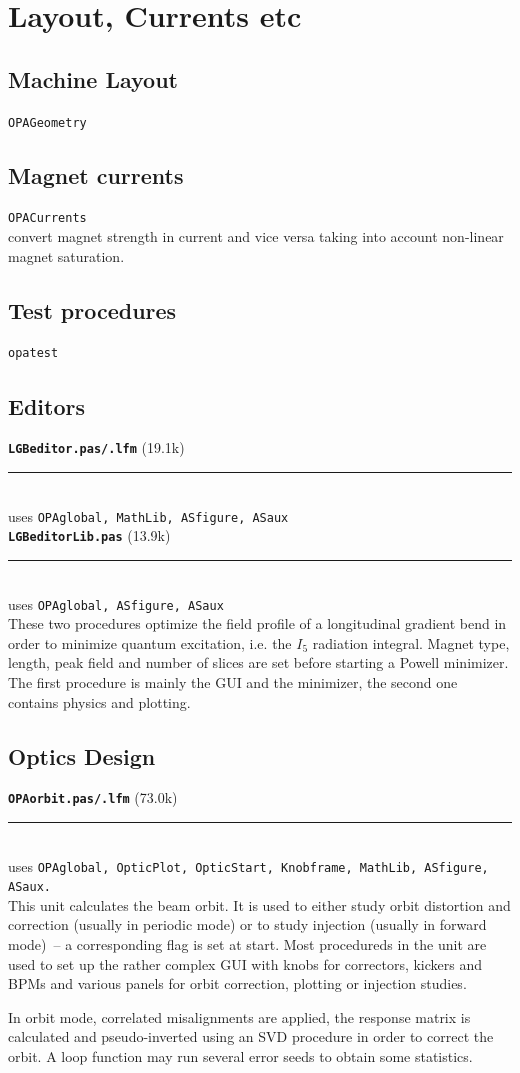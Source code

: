 \documentclass[12pt]{article}
\newcommand\code[1]{{\tt #1}}
\newcommand{\unico}[1]{{\color{burntorange}\code{#1}}}
\newcommand{\opagui}[1]{\colorbox{blue!20}{\code{#1}}}
\newcommand{\oguih}[2]{\subsection{\label{#2}#1}{\Huge\opagui{#2}}\\}
\newcommand{\opauni}[1]{\colorbox{orange!30}{\code{#1}}}
\newcommand{\ounih}[2]{\subsection{\label{#2}#1}{\Huge\opauni{#2}}\\}
\newcommand\opamodule[3]{{\bf \tt #1} #2\\  \rule[3pt]{\textwidth}{0.2pt} \\ {\scriptsize uses \tt  #3}\\[1ex]}
\begin{document}
\section{\label{secelse}Layout, Currents etc}

\oguih{Machine Layout}{OPAGeometry}

\oguih{Magnet currents}{OPACurrents}

\unico{getKfromI, getdKdIfac, getIfromK} convert  magnet strength in current and vice versa taking into account non-linear magnet saturation.

\ounih{Test procedures}{opatest} 





\subsection{Editors}



\opamodule{LGBeditor.pas/.lfm}{(19.1k)}{OPAglobal,  MathLib, ASfigure, ASaux}
\opamodule{LGBeditorLib.pas}{(13.9k)}{OPAglobal, ASfigure, ASaux}
These two procedures optimize the field profile of a longitudinal gradient bend in order to minimize quantum excitation, i.e. the $I_5$ radiation integral. Magnet type, length, peak field and number of slices are set before starting a Powell minimizer. The first procedure is mainly the GUI and the minimizer, the second one contains physics and plotting.

\subsection{Optics Design}



\opamodule{OPAorbit.pas/.lfm}{(73.0k)}{OPAglobal, OpticPlot,  OpticStart, Knobframe, MathLib, ASfigure, ASaux.}
This unit calculates the beam orbit. It is used to either study orbit distortion and correction (usually in periodic mode) or to study injection (usually in forward mode)~-- a corresponding flag is set at start. Most procedureds in the unit are used to set up the rather complex GUI with knobs for correctors, kickers and BPMs and various panels for orbit correction, plotting or injection studies.

In orbit mode, correlated misalignments are applied, the response matrix is calculated and pseudo-inverted using an SVD procedure in order to correct the orbit. A loop function may run several error seeds to obtain some statistics.
\end{document}
